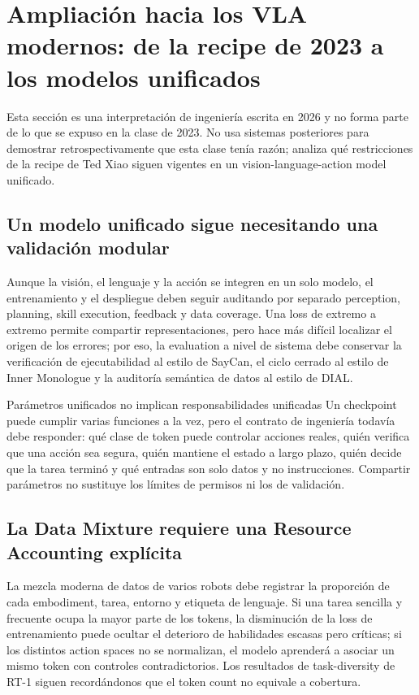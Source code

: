 \section{Ampliación hacia los VLA modernos: de la recipe de 2023 a los modelos unificados}

Esta sección es una interpretación de ingeniería escrita en 2026 y no forma parte de lo que se expuso en la clase de 2023. No usa sistemas posteriores para demostrar retrospectivamente que esta clase tenía razón; analiza qué restricciones de la recipe de Ted Xiao siguen vigentes en un vision-language-action model unificado.

\subsection{Un modelo unificado sigue necesitando una validación modular}

Aunque la visión, el lenguaje y la acción se integren en un solo modelo, el entrenamiento y el despliegue deben seguir auditando por separado perception, planning, skill execution, feedback y data coverage. Una loss de extremo a extremo permite compartir representaciones, pero hace más difícil localizar el origen de los errores; por eso, la evaluation a nivel de sistema debe conservar la verificación de ejecutabilidad al estilo de SayCan, el ciclo cerrado al estilo de Inner Monologue y la auditoría semántica de datos al estilo de DIAL.

\begin{importantbox}{Parámetros unificados no implican responsabilidades unificadas}
Un checkpoint puede cumplir varias funciones a la vez, pero el contrato de ingeniería todavía debe responder: qué clase de token puede controlar acciones reales, quién verifica que una acción sea segura, quién mantiene el estado a largo plazo, quién decide que la tarea terminó y qué entradas son solo datos y no instrucciones. Compartir parámetros no sustituye los límites de permisos ni los de validación.
\end{importantbox}

\subsection{La Data Mixture requiere una Resource Accounting explícita}

La mezcla moderna de datos de varios robots debe registrar la proporción de cada embodiment, tarea, entorno y etiqueta de lenguaje. Si una tarea sencilla y frecuente ocupa la mayor parte de los tokens, la disminución de la loss de entrenamiento puede ocultar el deterioro de habilidades escasas pero críticas; si los distintos action spaces no se normalizan, el modelo aprenderá a asociar un mismo token con controles contradictorios. Los resultados de task-diversity de RT-1 siguen recordándonos que el token count no equivale a cobertura.

